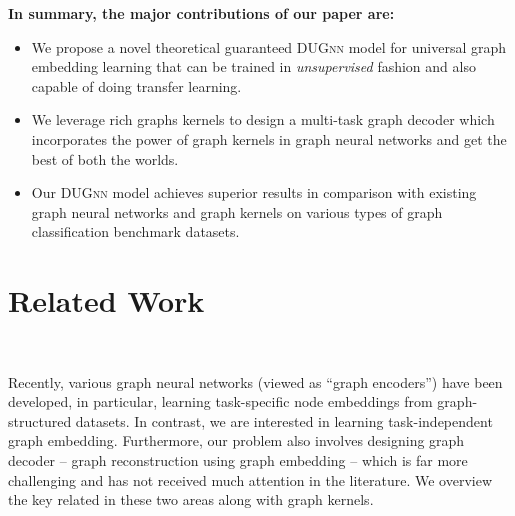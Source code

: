 \documentclass{article}
\begin{document}
\textbf{In summary, the major contributions of our paper are: }
\vspace{-0.5em}
\begin{itemize}[leftmargin=*]
	\setlength\itemsep{-0.1em}
	\item  We propose a novel theoretical guaranteed \textsc{DUGnn} model for universal graph embedding learning  that can be trained in {\em  unsupervised} fashion  and also capable of doing transfer learning. 
	\item  We leverage rich graphs kernels to design a multi-task graph decoder which incorporates the power of graph kernels in graph neural networks and get the best of both the worlds.  \item  Our \textsc{DUGnn}  model  achieves superior results in comparison with existing graph neural networks and graph kernels on  various types of graph classification benchmark datasets. 
\end{itemize}
\vspace{-1em}









\section{Related Work}~\label{sec:related_work}
\vspace{-2.5em}

Recently, various graph neural networks (viewed as   ``graph encoders'')   have been developed, in particular, learning task-specific node embeddings from graph-structured datasets. In contrast, we are interested in learning task-independent graph embedding. Furthermore, our problem also involves designing graph decoder -- graph reconstruction using    graph embedding -- which is far more challenging and  has not received much attention in the literature.  We overview the key related in these two areas along with graph kernels.  
\end{document}
